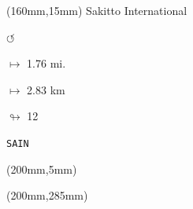 \begin{textblock*}{40mm}(160mm,15mm)%
Sakitto International
\par \Huge$\circlearrowleft$
\Large
\par$\mapsto$ 1.76 mi.
\par$\mapsto$ 2.83 km
\par$\looparrowright$ 12
\par\hfill\tiny\tt SAIN\\
\end{textblock*}
\begin{textblock*}{20mm}(200mm,5mm)%
\fbox{\thepage}
\end{textblock*}
\begin{textblock*}{20mm}(200mm,285mm)%
\fbox{\thepage}
\end{textblock*}
\null\newpage

